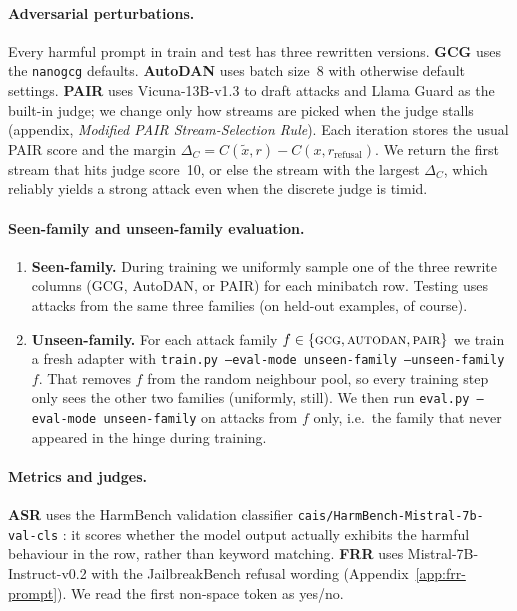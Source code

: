 \documentclass{article}
\begin{document}
\paragraph{Adversarial perturbations.}
Every harmful prompt in train and test has three rewritten versions. \textbf{GCG} \citep{zou2023gcg} uses the \texttt{nanogcg} defaults. \textbf{AutoDAN} \citep{liu2024autodan} uses batch size~8 with otherwise default settings. \textbf{PAIR} \citep{chao2023pair} uses Vicuna-13B-v1.3 \citep{zheng2023vicuna} to draft attacks and Llama Guard as the built-in judge; we change only how streams are picked when the judge stalls (appendix, \emph{Modified PAIR Stream-Selection Rule}). Each iteration stores the usual PAIR score and the margin $\Delta_C = C(\tilde{x},r)-C(x,r_{\text{refusal}})$. We return the first stream that hits judge score~10, or else the stream with the largest $\Delta_C$, which reliably yields a strong attack even when the discrete judge is timid.

\paragraph{Seen-family and unseen-family evaluation.}
\begin{enumerate}[label=(\alph*),leftmargin=*]
\item \textbf{Seen-family.} During training we uniformly sample one of the three rewrite columns (GCG, AutoDAN, or PAIR) for each minibatch row. Testing uses attacks from the same three families (on held-out examples, of course).
\item \textbf{Unseen-family.} For each attack family $f\in\{\textsc{gcg},\textsc{autodan},\textsc{pair}\}$ we train a fresh adapter with \texttt{train.py --eval-mode unseen-family --unseen-family $f$}. That removes $f$ from the random neighbour pool, so every training step only sees the other two families (uniformly, still). We then run \texttt{eval.py --eval-mode unseen-family} on attacks from $f$ only, i.e.\ the family that never appeared in the hinge during training.
\end{enumerate}

\paragraph{Metrics and judges.}
\textbf{ASR} uses the HarmBench validation classifier \texttt{cais/HarmBench-Mistral-7b-val-cls} \citep{mazeika2024harmbench}: it scores whether the model output actually exhibits the harmful behaviour in the row, rather than keyword matching. \textbf{FRR} uses Mistral-7B-Instruct-v0.2 \citep{jiang2023mistral} with the JailbreakBench refusal wording \citep{chao2024jailbreakbench} (Appendix~\ref{app:frr-prompt}). We read the first non-space token as yes/no.
\end{document}
